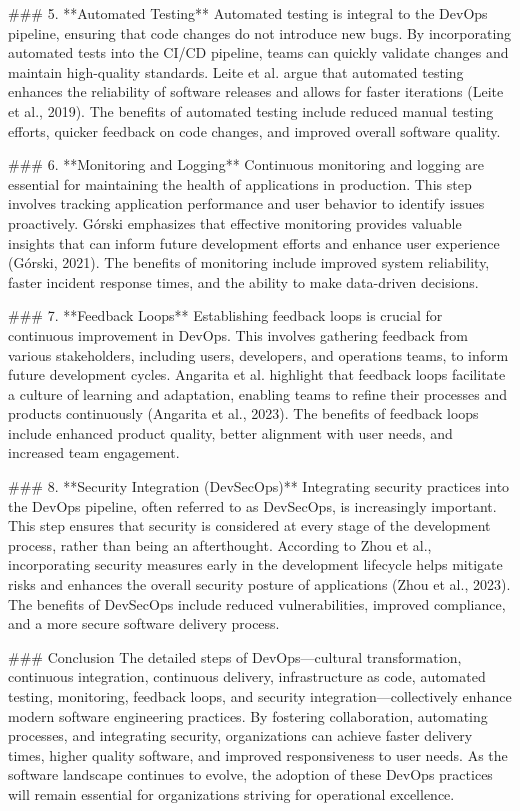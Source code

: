 ### 5. **Automated Testing**
Automated testing is integral to the DevOps pipeline, ensuring that code changes do not introduce new bugs. By incorporating automated tests into the CI/CD pipeline, teams can quickly validate changes and maintain high-quality standards. Leite et al. argue that automated testing enhances the reliability of software releases and allows for faster iterations (Leite et al., 2019). The benefits of automated testing include reduced manual testing efforts, quicker feedback on code changes, and improved overall software quality.

### 6. **Monitoring and Logging**
Continuous monitoring and logging are essential for maintaining the health of applications in production. This step involves tracking application performance and user behavior to identify issues proactively. Górski emphasizes that effective monitoring provides valuable insights that can inform future development efforts and enhance user experience (Górski, 2021). The benefits of monitoring include improved system reliability, faster incident response times, and the ability to make data-driven decisions.

### 7. **Feedback Loops**
Establishing feedback loops is crucial for continuous improvement in DevOps. This involves gathering feedback from various stakeholders, including users, developers, and operations teams, to inform future development cycles. Angarita et al. highlight that feedback loops facilitate a culture of learning and adaptation, enabling teams to refine their processes and products continuously (Angarita et al., 2023). The benefits of feedback loops include enhanced product quality, better alignment with user needs, and increased team engagement.

### 8. **Security Integration (DevSecOps)**
Integrating security practices into the DevOps pipeline, often referred to as DevSecOps, is increasingly important. This step ensures that security is considered at every stage of the development process, rather than being an afterthought. According to Zhou et al., incorporating security measures early in the development lifecycle helps mitigate risks and enhances the overall security posture of applications (Zhou et al., 2023). The benefits of DevSecOps include reduced vulnerabilities, improved compliance, and a more secure software delivery process.

### Conclusion
The detailed steps of DevOps—cultural transformation, continuous integration, continuous delivery, infrastructure as code, automated testing, monitoring, feedback loops, and security integration—collectively enhance modern software engineering practices. By fostering collaboration, automating processes, and integrating security, organizations can achieve faster delivery times, higher quality software, and improved responsiveness to user needs. As the software landscape continues to evolve, the adoption of these DevOps practices will remain essential for organizations striving for operational excellence.

